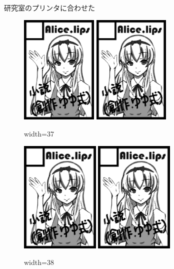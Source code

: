 \documentclass[a4paper]{jarticle}
\begin{document}
研究室のプリンタに合わせた

\begin{figure}
  \includegraphics[width=37mm,bb=0 0 600 853]{alice.png}
  \hfill
  \includegraphics[width=37mm,bb=0 0 600 853]{alice.png}
  \caption{width=37}
\end{figure}

\begin{figure}
  \includegraphics[width=38mm,bb=0 0 600 853]{alice.png}
  \hfill
  \includegraphics[width=38mm,bb=0 0 600 853]{alice.png}
  \caption{width=38}
\end{figure}
\end{document}
